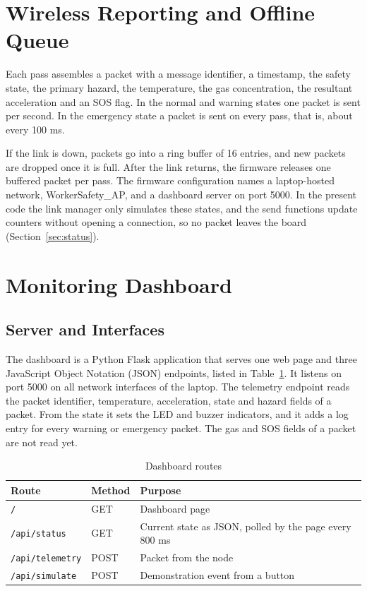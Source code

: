 \documentclass[conference]{IEEEtran}
\begin{document}
\section{Wireless Reporting and Offline Queue}
\label{sec:wireless}
Each pass assembles a packet with a message identifier, a timestamp, the safety state, the primary hazard, the temperature, the gas concentration, the resultant acceleration and an SOS flag. In the normal and warning states one packet is sent per second. In the emergency state a packet is sent on every pass, that is, about every 100 ms.

If the link is down, packets go into a ring buffer of 16 entries, and new packets are dropped once it is full. After the link returns, the firmware releases one buffered packet per pass. The firmware configuration names a laptop-hosted network, WorkerSafety\_AP, and a dashboard server on port 5000. In the present code the link manager only simulates these states, and the send functions update counters without opening a connection, so no packet leaves the board (Section~\ref{sec:status}).

\section{Monitoring Dashboard}
\label{sec:dashboard}

\subsection{Server and Interfaces}
The dashboard is a Python Flask application that serves one web page and three JavaScript Object Notation (JSON) endpoints, listed in Table~\ref{tab:endpoints}. It listens on port 5000 on all network interfaces of the laptop. The telemetry endpoint reads the packet identifier, temperature, acceleration, state and hazard fields of a packet. From the state it sets the LED and buzzer indicators, and it adds a log entry for every warning or emergency packet. The gas and SOS fields of a packet are not read yet.

\begin{table}[!t]
\caption{Dashboard routes}
\label{tab:endpoints}
\centering
\begin{tabular}{|p{1.0in}|p{0.45in}|p{1.4in}|}
\hline
\textbf{Route} & \textbf{Method} & \textbf{Purpose} \\
\hline
\texttt{/} & GET & Dashboard page \\
\hline
\texttt{/api/status} & GET & Current state as JSON, polled by the page every 800 ms \\
\hline
\texttt{/api/telemetry} & POST & Packet from the node \\
\hline
\texttt{/api/simulate} & POST & Demonstration event from a button \\
\hline
\end{tabular}
\end{table}
\end{document}

